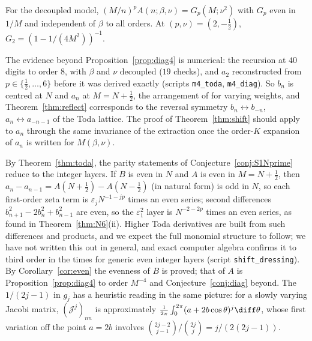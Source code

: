 \begin{conjecture}\label{conj:diag}
For the decoupled model, $(M/n)^pA(n;\beta,\nu)=G_p(M;\nu^2)$ with $G_p$ even in $1/M$ and independent of $\beta$ to all orders.
At $(p,\nu)=(2,-\frac12)$, $G_2=(1-1/(4M^2))^{-1}$.
\end{conjecture}

The evidence beyond Proposition~\ref{prop:diag4} is numerical: the recursion at $40$ digits to order $8$, with $\beta$ and $\nu$
decoupled ($19$ checks), and $a_2$ reconstructed from $p\in\{\frac12,\dots,6\}$ before it was derived exactly (scripts \texttt{m4\_toda},
\texttt{m4\_diag}). So $b_n$ is centred at $N$ and $a_n$ at $M=N+\frac12$, the arrangement of
\cite[Theorem~5.2]{BleherIts} for varying weights, and Theorem~\ref{thm:reflect} corresponds to the reversal symmetry
$b_n\leftrightarrow b_{-n}$, $a_n\leftrightarrow a_{-n-1}$ of the Toda lattice. The proof of Theorem~\ref{thm:shift} should apply to
$a_n$ through the same invariance of the extraction once the order-$K$ expansion of $a_n$ is written for $M(\beta,\nu)$.

\begin{remark}\label{rem:parity}
By Theorem~\ref{thm:toda}, the parity statements of Conjecture~\ref{conj:S1Nprime} reduce to the integer layers. If $B$ is
even in $N$ and $A$ is even in $M=N+\frac12$, then $a_n-a_{n-1}=A(N+\frac12)-A(N-\frac12)$ (in natural form) is odd in $N$, so each
first-order zeta term is $\varepsilon_jN^{-1-jp}$ times an even series; second differences $b_{n+1}^2-2b_n^2+b_{n-1}^2$ are even, so the
$\varepsilon_1^2$ layer is $N^{-2-2p}$ times an even series, as found in Theorem~\ref{thm:N6}(ii). Higher Toda derivatives are built
from such differences and products, and we expect the full monomial structure to follow; we have not written this out in general,
and exact computer algebra confirms it to third order in the times for generic even integer layers (script \texttt{shift\_dressing}). By
Corollary~\ref{cor:even} the evenness of $B$ is proved; that of $A$ is Proposition~\ref{prop:diag4} to order $M^{-4}$ and
Conjecture~\ref{conj:diag} beyond. The $1/(2j-1)$ in $g_j$ has a
heuristic reading in the same picture: for a slowly varying Jacobi matrix, $(\mathcal J^j)_{nn}$ is approximately
$\frac1{2\pi}\int_0^{2\pi}(a+2b\cos\theta)^j\diff\theta$, whose first variation off the point $a=2b$ involves
$\binom{2j-2}{j-1}/\binom{2j}j=j/(2(2j-1))$.
\end{remark}
